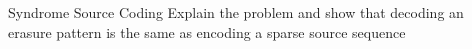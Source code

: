 \documentclass[10pt,xcolor=table]{beamer}
\begin{document}
%		
%		
%			
%			
%					
%			
%		
%		
\begin{frame}{Syndrome Source Coding}
Explain the problem and show that decoding an erasure pattern is the same as encoding a sparse source sequence
\end{frame}
\end{document}
